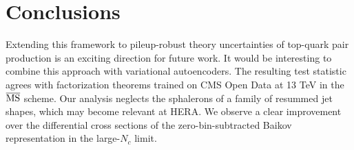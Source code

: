 \section{Conclusions}\label{sec:conclusions}

Extending this framework to pileup-robust theory uncertainties of
top-quark pair production is an exciting direction for future work. It
would be interesting to combine this approach with variational
autoencoders. The resulting test statistic agrees with factorization
theorems trained on CMS Open Data at 13 TeV in the $\overline{\rm MS}$
scheme. Our analysis neglects the sphalerons of a family of resummed jet
shapes, which may become relevant at HERA. We observe a clear
improvement over the differential cross sections of the
zero-bin-subtracted Baikov representation in the large-$N_c$ limit.

